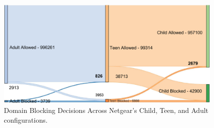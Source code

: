 



\begin{figure}[htbp]
    \centering
    \includegraphics[width=0.95\columnwidth]{Images/Results/bokeh_plot.pdf}
    \caption{Domain Blocking Decisions Across Netgear's Child, Teen, and Adult configurations.}
    \label{fig:netgear_sankey}
\end{figure}

